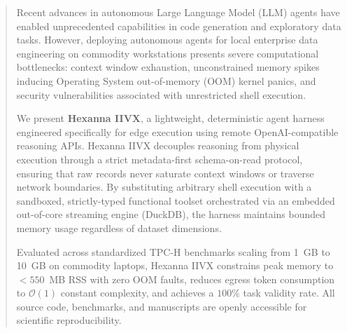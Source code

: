 \begin{abstract}
Recent advances in autonomous Large Language Model (LLM) agents have enabled unprecedented capabilities in code generation and exploratory data tasks. However, deploying autonomous agents for local enterprise data engineering on commodity workstations presents severe computational bottlenecks: context window exhaustion, unconstrained memory spikes inducing Operating System out-of-memory (OOM) kernel panics, and security vulnerabilities associated with unrestricted shell execution. 

We present \textbf{Hexanna IIVX}, a lightweight, deterministic agent harness engineered specifically for edge execution using remote OpenAI-compatible reasoning APIs. Hexanna IIVX decouples reasoning from physical execution through a strict metadata-first schema-on-read protocol, ensuring that raw records never saturate context windows or traverse network boundaries. By substituting arbitrary shell execution with a sandboxed, strictly-typed functional toolset orchestrated via an embedded out-of-core streaming engine (DuckDB), the harness maintains bounded memory usage regardless of dataset dimensions. 

Evaluated across standardized TPC-H benchmarks scaling from 1~GB to 10~GB on commodity laptops, Hexanna IIVX constrains peak memory to $<550$~MB RSS with zero OOM faults, reduces egress token consumption to $\mathcal{O}(1)$ constant complexity, and achieves a $100\%$ task validity rate. All source code, benchmarks, and manuscripts are openly accessible for scientific reproducibility.
\end{abstract}
